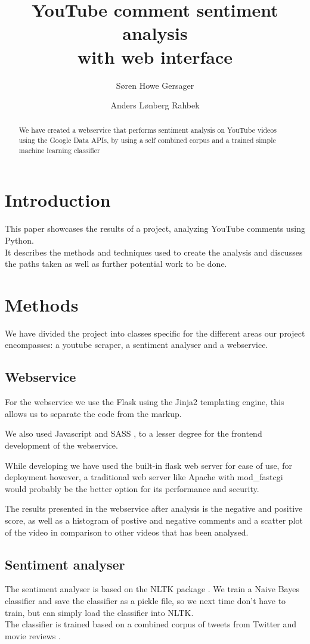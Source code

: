 \documentclass[conference]{IEEEtran}
\title{YouTube comment sentiment analysis \\with web interface}
\author{Søren Howe Gersager \\ \IEEEauthorblockN{s094557}
\IEEEauthorblockA{Technical University of Denmark}
\and
Anders Lønberg Rahbek \\ \IEEEauthorblockN{s107029}
\IEEEauthorblockA{Technical University of Denmark}
}
\begin{document}
\maketitle

\begin{abstract}
We have created a webservice that performs sentiment analysis on 
YouTube videos using the Google Data APIs, 
by using a self combined corpus and a trained simple machine learning classifier
\end{abstract}

\section{Introduction}
This paper showcases the results of a project, analyzing YouTube comments using Python. \\
It describes the methods and techniques used to create the analysis and discusses the paths taken as well as further potential work to be done.

\section{Methods}

We have divided the project into classes specific for the different areas our project encompasses: a youtube scraper, a sentiment analyser and a webservice.

\subsection{Webservice}
For the webservice we use the Flask \cite{flask} using the Jinja2 \cite{jinja2} templating engine, this allows us to separate the code from the markup.

We also used Javascript and SASS \cite{sass},  to a lesser degree for the frontend development of the webservice.

While developing we have used the built-in flask web server for ease of use, for deployment however, a traditional web server like Apache with mod\_fastcgi would probably be the better option for its performance and security.

The results presented in the webservice after analysis is the negative and positive score, as well as a histogram of postive and negative comments and a scatter plot of the video in comparison to other videos that has been analysed.

\subsection{Sentiment analyser}
The sentiment analyser is based on the NLTK package \cite{nltk}. We train a Naive Bayes classifier and save the classifier as a pickle file, so we next time don't  have to train, but can simply load the classifier into NLTK. \\
The classifier is trained based on a combined corpus of tweets from Twitter \cite{twitter} and movie reviews \cite{movie_corpus}. \\
\end{document}
